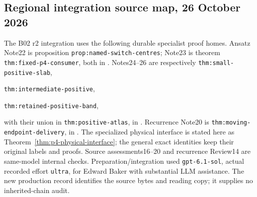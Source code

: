 \subsection*{Regional integration source map, 26 October 2026}
The B02 r2 integration uses the following durable specialist proof homes.
Ansatz Note22 \cite{an22} is proposition
\texttt{prop:named-switch-centres}; Note23 \cite{an23} is theorem
\texttt{thm:fixed-p4-consumer}, both in
.
Notes24--26 \cite{an24,an25,an26} are respectively
\texttt{thm:small-positive-slab},\par\noindent
\texttt{thm:intermediate-positive},\par\noindent
\texttt{thm:retained-positive-band},\par\noindent
with their union in \texttt{thm:positive-atlas}, in
.
Recurrence Note20 \cite{rn20} is
\texttt{thm:moving-endpoint-delivery}, in
.
The specialized physical interface is stated here as
Theorem~\ref{thm:p4-physical-interface}; the general exact identities keep
their original labels and proofs. Source assessments16--20 and recurrence
Review14 are same-model internal checks. Preparation/integration used
\texttt{gpt-6.1-sol}, actual recorded effort \texttt{ultra}, for Edward
Baker with substantial LLM assistance. The new production record identifies
the source bytes and reading copy; it supplies no inherited-chain audit.
